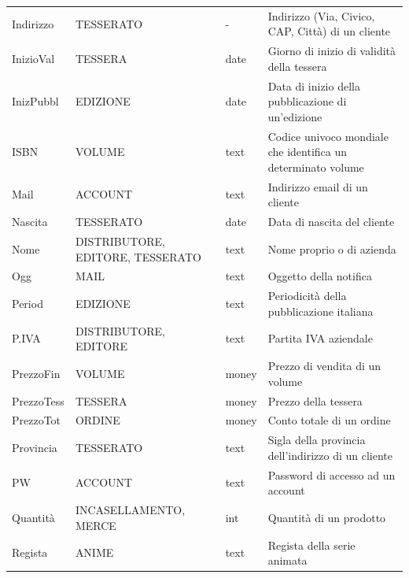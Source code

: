 \documentclass[a4paper]{scrartcl}
\begin{document}
\begin{footnotesize}
\begin{longtable}{p{} p{} p{} p{}}
	Indirizzo &
	TESSERATO &
	- &
	Indirizzo (Via, Civico, CAP, Città) di un cliente \\
	
	InizioVal &
	TESSERA &
	date &
	Giorno di inizio di validità della tessera \\	
	
	InizPubbl &
	EDIZIONE &
	date &
	Data di inizio della pubblicazione di un'edizione \\
		
	ISBN & 
	VOLUME &
	text &
	Codice univoco mondiale che identifica un determinato volume \\
		
	Mail &
	ACCOUNT &
	text &
	Indirizzo email di un cliente \\
	
	Nascita &
	TESSERATO &
	date &
	Data di nascita del cliente \\
	
	Nome &
	DISTRIBUTORE, EDITORE, TESSERATO &
	text &
	Nome proprio o di azienda \\
	
	Ogg &
	MAIL &
	text &
	Oggetto della notifica \\
	
	Period &
	EDIZIONE &
	text &
	Periodicità della pubblicazione italiana \\
	
	P.IVA &
	DISTRIBUTORE, EDITORE &
	text &
	Partita IVA aziendale \\
	
	PrezzoFin &
	VOLUME &
	money &
	Prezzo di vendita di un volume \\
	
	PrezzoTess &
	TESSERA &
	money &
	Prezzo della tessera \\
	
	PrezzoTot &
	ORDINE &
	money &
	Conto totale di un ordine \\
	
	Provincia &
	TESSERATO &
	text &
	Sigla della provincia dell'indirizzo di un cliente \\
	
	PW &
	ACCOUNT &
	text &
	Password di accesso ad un account \\
	
	Quantità &
	INCASELLAMENTO, MERCE &
	int &
	Quantità di un prodotto \\
	
	Regista &
	ANIME &
	text &
	Regista della serie animata \\
	

\end{longtable}
\end{footnotesize}
\end{document}
